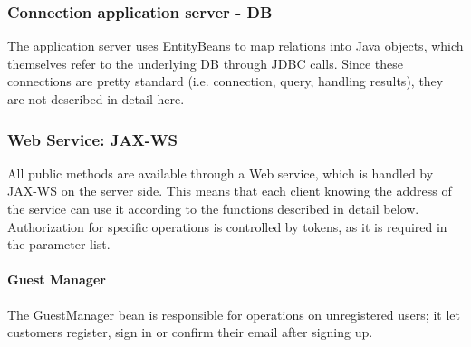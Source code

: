 \subsubsection{Connection application server - DB} %
\label{ssub:connection_application_server_db}
The application server uses EntityBeans to map relations into Java objects, which themselves refer to the underlying DB through JDBC calls. Since these connections are pretty standard (i.e. connection, query, handling results), they are not described in detail here.

\subsubsection{Web Service: JAX-WS} %
\label{ssub:web_service_jax_ws}
All public methods are available through a Web service, which is handled by JAX-WS on the server side. This means that each client knowing the address of the service can use it according to the functions described in detail below. Authorization for specific operations is controlled by tokens, as it is required in the parameter list.

\newpage
\paragraph{Guest Manager} %
\label{par:guest_manager}
The GuestManager bean is responsible for operations on unregistered users; it let customers register, sign in or confirm their email after signing up.
\begin{table}[h!]
\centering
{}
\end{table}

